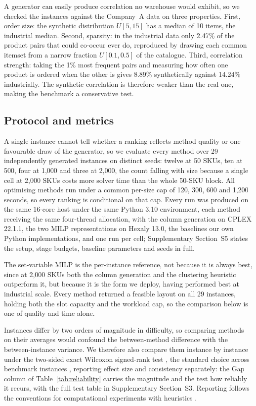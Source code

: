 \documentclass[]{interact}
\begin{document}
A generator can easily produce correlation no warehouse would exhibit, so we checked the instances against the Company~A data on three properties. First, order size: the synthetic distribution $U[5,15]$ has a median of 10 items, the industrial median. Second, sparsity: in the industrial data only 2.47\% of the product pairs that could co-occur ever do, reproduced by drawing each common itemset from a narrow fraction $U[0.1,0.5]$ of the catalogue. Third, correlation strength: taking the 1\% most frequent pairs and measuring how often one product is ordered when the other is gives 8.89\% synthetically against 14.24\% industrially. The synthetic correlation is therefore weaker than the real one, making the benchmark a conservative test.

\subsection{Protocol and metrics}
A single instance cannot tell whether a ranking reflects method quality or one favourable draw of the generator, so we evaluate every method over 29 independently generated instances on distinct seeds: twelve at 50 SKUs, ten at 500, four at 1,000 and three at 2,000, the count falling with size because a single cell at 2,000 SKUs costs more solver time than the whole 50-SKU block. All optimising methods run under a common per-size cap of 120, 300, 600 and 1,200 seconds, so every ranking is conditional on that cap. Every run was produced on the same 16-core host under the same Python 3.10 environment, each method receiving the same four-thread allocation, with the column generation on CPLEX 22.1.1, the two MILP representations on Hexaly 13.0, the baselines our own Python implementations, and one run per cell; Supplementary Section~S5 states the setup, stage budgets, baseline parameters and seeds in full.

The set-variable MILP is the per-instance reference, not because it is always best, since at 2,000 SKUs both the column generation and the clustering heuristic outperform it, but because it is the form we deploy, having performed best at industrial scale. Every method returned a feasible layout on all 29 instances, holding both the slot capacity and the workload cap, so the comparison below is one of quality and time alone.

Instances differ by two orders of magnitude in difficulty, so comparing methods on their averages would confound the between-method difference with the between-instance variance. We therefore also compare them instance by instance under the two-sided exact Wilcoxon signed-rank test \citep{wilcoxon1945}, the standard choice across benchmark instances \citep{demsar2006}, reporting effect size and consistency separately: the Gap column of Table~\ref{tab:reliability} carries the magnitude and the test how reliably it recurs, with the full test table in Supplementary Section~S3. Reporting follows the conventions for computational experiments with heuristics \citep{barr1995designing, hooker1995testing}.
\end{document}
